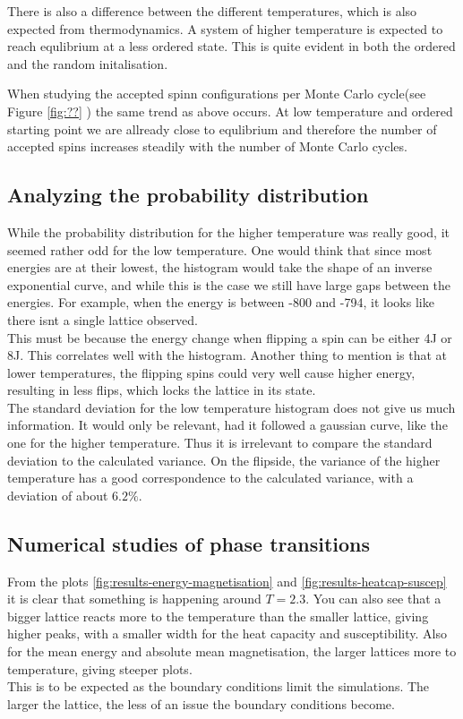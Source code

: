 \documentclass[../main.tex]{subfiles}
\begin{document}
There is also a difference between the different temperatures, which is also expected from thermodynamics. A system of higher temperature is expected to reach equlibrium at a less ordered state. This is quite evident in both the ordered and the random initalisation.

When studying the accepted spinn configurations per Monte Carlo cycle(see Figure \ref{fig:??} ) the same trend as above occurs. At low temperature and ordered starting point we are allready close to equlibrium and therefore the number of accepted spins increases steadily with the number of Monte Carlo cycles.


\subsection{Analyzing the probability distribution}
While the probability distribution for the higher temperature was really good, it seemed rather odd for the low temperature. One would think that since most energies are at their lowest, the histogram would take the shape of an inverse exponential curve, and while this is the case we still have large gaps between the energies. For example, when the energy is between -800 and -794, it looks like there isnt a single lattice observed. \\
This must be because the energy change when flipping a spin can be either 4J or 8J. This correlates well with the histogram. Another thing to mention is that at lower temperatures, the flipping spins could very well cause higher energy, resulting in less flips, which locks the lattice in its state. \\
The standard deviation for the low temperature histogram does not give us much information. It would only be relevant, had it followed a gaussian curve, like the one for the higher temperature. Thus it is irrelevant to compare the standard deviation to the calculated variance. On the flipside, the variance of the higher temperature has a good correspondence to the calculated variance, with a deviation of about $6.2\%$.

\subsection{Numerical studies of phase transitions}
From the plots \ref{fig:results-energy-magnetisation} and \ref{fig:results-heatcap-suscep} it is clear that something is happening around $T = 2.3$. You can also see that a bigger lattice reacts more to the temperature than the smaller lattice, giving higher peaks, with a smaller width for the heat capacity and susceptibility. Also for the mean energy and absolute mean magnetisation, the larger lattices  more to temperature, giving steeper plots.\\
This is to be expected as the boundary conditions limit the simulations. The larger the lattice, the less of an issue the boundary conditions become.
\end{document}
